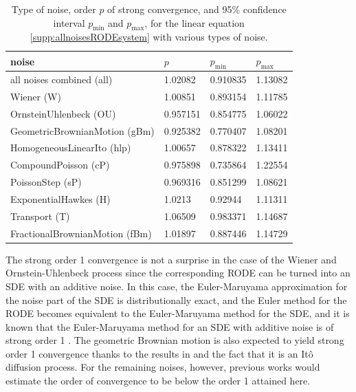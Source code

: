 \documentclass[reqno,12pt]{amsart}
\theoremstyle{plain} %
\theoremstyle{definition} %
\begin{document}
\begin{table}
    \begin{center}
        \begin{tabular}[htb]{|l|l|l|l|}
            \hline noise & $p$ & $p_{\textrm{min}}$ & $p_{\textrm{max}}$ \\
            \hline \hline
            all noises combined (all) & 1.02082 & 0.910835 & 1.13082 \\
            Wiener (W) & 1.00851 & 0.893154 & 1.11785 \\
            OrnsteinUhlenbeck (OU) & 0.957151 & 0.854775 & 1.06022 \\
            GeometricBrownianMotion (gBm) & 0.925382 & 0.770407 & 1.08201 \\
            HomogeneousLinearIto (hlp) & 1.00657 & 0.878322 & 1.13411 \\
            CompoundPoisson (cP) & 0.975898 & 0.735864 & 1.22554 \\
            PoissonStep (sP) & 0.969316 & 0.851299 & 1.08621 \\
            ExponentialHawkes (H) & 1.0213 & 0.92944 & 1.11311 \\
            Transport (T) & 1.06509 & 0.983371 & 1.14687 \\
            FractionalBrownianMotion (fBm) & 1.01897 & 0.887446 & 1.14729 \\
            \hline
        \end{tabular}
    \end{center}

    \bigskip

    \caption{Type of noise, order $p$ of strong convergence, and 95\% confidence interval $p_{\textrm{min}}$ and $p_{\textrm{max}}$, for the linear equation \cref{supp:allnoisesRODEsystem} with various types of noise.}

    \label{supp:tabeachnoise}
\end{table}

The strong order 1 convergence is not a surprise in the case of the Wiener and Ornstein-Uhlenbeck process since the corresponding RODE can be turned into an SDE with an additive noise. In this case, the Euler-Maruyama approximation for the noise part of the SDE is distributionally exact, and the Euler method for the RODE becomes equivalent to the Euler-Maruyama method for the SDE, and it is known that the Euler-Maruyama method for an SDE with additive noise is of strong order 1 \cite{HighamKloeden2021}. The geometric Brownian motion is also expected to yield strong order 1 convergence thanks to the results in \cite{WangCaoHanKloeden2021} and the fact that it is an It\^o diffusion process. For the remaining noises, however, previous works would estimate the order of convergence to be below the order 1 attained here.
\end{document}
